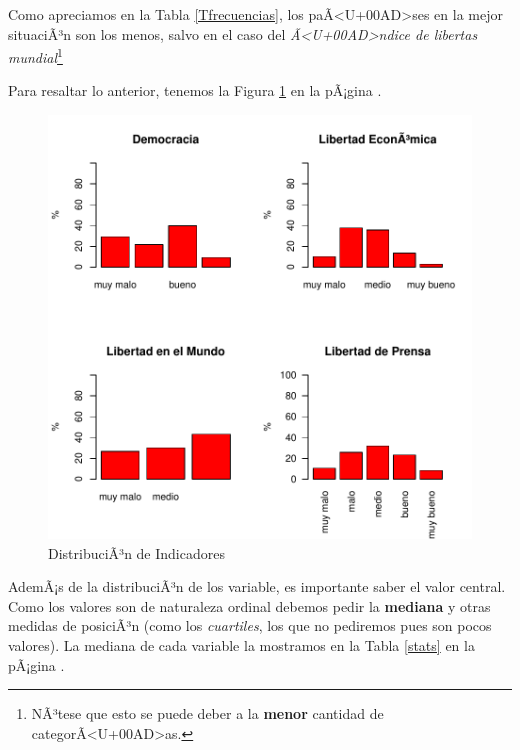 \documentclass{article}
\begin{document}
Como apreciamos en la Tabla \ref{Tfrecuencias}, los paÃ<U+00AD>ses en la mejor situaciÃ³n son los menos, salvo en el caso del \emph{Ã<U+00AD>ndice de libertas mundial}\footnote{NÃ³tese que esto se puede deber a la {\bf menor} cantidad de categorÃ<U+00AD>as.}

\clearpage

Para resaltar lo anterior, tenemos la Figura \ref{barplots} en la pÃ¡gina \pageref{barplots}. 


\begin{figure}[h]
\centering
\includegraphics{paperVersion_6-barplots}
\caption{DistribuciÃ³n de Indicadores}
\label{barplots}
\end{figure}

AdemÃ¡s de la distribuciÃ³n de los variable, es importante saber el valor central. Como los valores son de naturaleza ordinal debemos pedir la {\bf mediana} y otras medidas de posiciÃ³n (como los \emph{cuartiles}, los que no pediremos pues son pocos valores). La mediana de cada variable la mostramos en la Tabla \ref{stats} en la pÃ¡gina \pageref{stats}.
\end{document}
